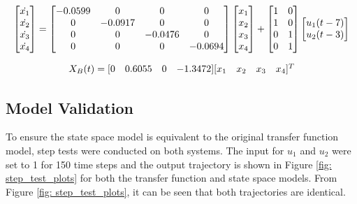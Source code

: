 \begin{equation}
    \centering
    \begin{bmatrix}
        \dot{x_1} \\
        \dot{x_2} \\
        \dot{x_3} \\
        \dot{x_4} 
    \end{bmatrix}
    =
    \begin{bmatrix}
        -0.0599     &     0     &     0     &     0 \\
        0           &  -0.0917  &     0     &     0 \\
        0           &     0     &   -0.0476 &     0 \\
        0           &     0     &     0     &  -0.0694
    \end{bmatrix}
    \begin{bmatrix}
        x_1 \\
        x_2 \\
        x_3 \\
        x_4 
    \end{bmatrix}
    +
    \begin{bmatrix}
        1     &     0  \\
        1     &     0  \\
        0     &     1  \\
        0     &     1
    \end{bmatrix}
    \begin{bmatrix}
        u_1(t - 7) \\
        u_2(t - 3)
    \end{bmatrix}
    \label{eq: x_ss_eq2}
\end{equation}

\begin{equation}
    \centering
    X_B(t) =  
    \begin{matrix}
        [0 & 0.6055 & 0 & -1.3472]
    \end{matrix}
    \begin{matrix}
        [x_1 & x_2 & x_3 & x_4]^T
    \end{matrix}
    \label{eq: X_B_output}
\end{equation}

\subsection{Model Validation}

To ensure the state space model is equivalent to the original transfer function model, step tests were conducted on both systems.  The input for $u_1$ and $u_2$ were set to 1 for 150 time steps and the output trajectory is shown in Figure \ref{fig: step_test_plots} for both the transfer function and state space models. From Figure \ref{fig: step_test_plots}, it can be seen that both trajectories are identical. 

